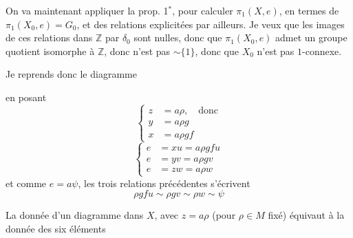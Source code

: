 
On va maintenant appliquer la prop. 1$^{*}$, pour calculer $\pi_1(X,e)$, en termes de $\pi_1(X_0,e)=G_0$, et des relations explicitées par ailleurs. Je veux   que les images de ces relations dans $\mathbb Z$ par $\delta_0$ sont nulles, donc que $\pi_1(X_0,e)$ admet un groupe quotient isomorphe à $\mathbb Z$, donc n'est pas $\sim\{1\}$, donc que $X_0$ n'est pas $1$-connexe.

Je reprends donc le diagramme

en posant
\[
\left\{\begin{aligned}z&=a\rho,\quad\text{donc}\\ y&=a\rho g\\ x&=a\rho gf\end{aligned}\right.
\]
\[
\left\{\begin{aligned}e&=xu=a\rho gfu\\ e&=yv=a\rho gv\\ e&=zw=a\rho w\end{aligned}\right.
\]
et comme $e=a\psi$, les trois relations précédentes s'écrivent
\[
\tag*{(**)}\boxed{\rho gfu\sim\rho gv\sim\rho w\sim\psi}
\]

La donnée d'un diagramme  dans $X$, avec $z=a\rho$ (pour $\rho\in M$ fixé) équivaut à la donnée des six éléments

